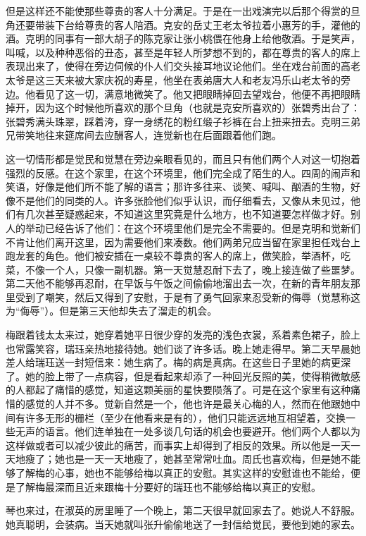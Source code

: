 \par 但是这样还不能使那些尊贵的客人十分满足。于是在一出戏演完以后那个得赏的旦角还要带装下台给尊贵的客人陪酒。克安的岳丈王老太爷拉着小惠芳的手，灌他的酒。克明的同事有一部大胡子的陈克家让张小桃偎在他身上给他敬酒。于是笑声，叫喊，以及种种恶俗的丑态，甚至是年轻人所梦想不到的，都在尊贵的客人的席上表现出来了，使得在旁边伺候的仆人们交头接耳地议论他们。坐在戏台前面的高老太爷是这三天来被大家庆祝的寿星，他坐在表弟唐大人和老友冯乐山老太爷的旁边。他看见了这一切，满意地微笑了。他又把眼睛掉回去望戏台，他便不再把眼睛掉开，因为这个时候他所喜欢的那个旦角（也就是克安所喜欢的）张碧秀出台了：张碧秀满头珠翠，踩着洿，穿一身绣花的粉红缎子衫裤在台上扭来扭去。克明三弟兄带笑地往来筵席间去应酬客人，连觉新也在后面跟着他们跑。
\par 这一切情形都是觉民和觉慧在旁边亲眼看见的，而且只有他们两个人对这一切抱着强烈的反感。在这个家里，在这个环境里，他们完全成了陌生的人。四周的闹声和笑语，好像是他们所不能了解的语言；那许多往来、谈笑、喊叫、酗酒的生物，好像不是他们的同类的人。许多张脸他们似乎认识，而仔细看去，又像从未见过，他们有几次甚至疑惑起来，不知道这里究竟是什么地方，也不知道要怎样做才好。别人的举动已经告诉了他们：在这个环境里他们是完全不需要的。但是克明和觉新们不肯让他们离开这里，因为需要他们来凑数。他们两弟兄应当留在家里担任戏台上跑龙套的角色。他们被安插在一桌较不尊贵的客人的席上，做笑脸，举酒杯，吃菜，不像一个人，只像一副机器。第一天觉慧忍耐下去了，晚上接连做了些噩梦。第二天他不能够再忍耐，在早饭与午饭之间偷偷地溜出去一次，在新的青年朋友那里受到了嘲笑，然后又得到了安慰，于是有了勇气回家来忍受新的侮辱（觉慧称这为“侮辱”）。但是第三天他却失去了溜走的机会。
\par 梅跟着钱太太来过，她穿着她平日很少穿的发亮的浅色衣裳，系着素色裙子，脸上也常露笑容，瑞珏亲热地接待她。她们谈了许多话。晚上她走得早。第二天早晨她差人给瑞珏送一封短信来：她生病了。梅的病是真病。在这些日子里她的病更深了。她的脸上带了一点病容，但是看起来却添了一种回光反照的美，使得稍微敏感的人都起了痛惜的感觉，知道这颗美丽的星快要陨落了。可是在这个家里有这种痛惜的感觉的人并不多。觉新自然是一个，他也许是最关心梅的人，然而在他跟她中间有许多无形的栅栏（至少在他看来是有的），他们只能远远地互相望着，交换一些无声的语言。他们连单独在一处多谈几句话的机会也要避开。他们两个人都以为这样做或者可以减少彼此的痛苦，而事实上却得到了相反的效果。所以他是一天一天地瘦了；她也是一天一天地瘦了，她甚至常常吐血。周氏也喜欢梅，但是她不能够了解梅的心事，她也不能够给梅以真正的安慰。其实这样的安慰谁也不能给，便是了解梅最深而且近来跟梅十分要好的瑞珏也不能够给梅以真正的安慰。
\par 琴也来过，在淑英的房里睡了一个晚上，第二天很早就回家去了。她说人不舒服。她真聪明，会装病。当天她就叫张升偷偷地送了一封信给觉民，要他到她的家去。
